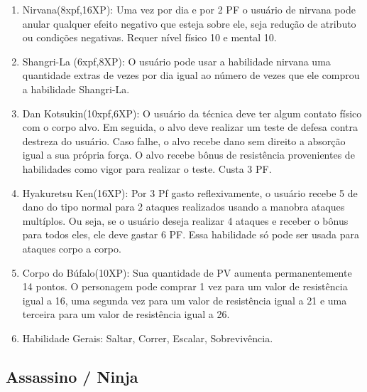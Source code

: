 \begin{enumerate}
	\item Nirvana(8xpf,16XP): Uma vez por dia e por 2 PF o usuário de nirvana pode anular qualquer efeito negativo que esteja sobre ele, seja redução de atributo ou condições negativas. Requer nível físico 10 e mental 10.
	  
  \item Shangri-La (6xpf,8XP): O usuário pode usar a habilidade nirvana uma quantidade extras de vezes por dia igual ao número de vezes que ele comprou a habilidade Shangri-La.
	
	\item Dan Kotsukin(10xpf,6XP): O usuário da técnica deve ter algum contato físico com o corpo alvo. Em seguida, o alvo deve realizar um teste de defesa contra destreza do usuário. Caso falhe, o alvo recebe dano sem direito a absorção igual a sua própria força. O alvo recebe bônus de resistência provenientes de habilidades como vigor para realizar o teste. Custa 3 PF. 
	
	\item Hyakuretsu Ken(16XP): Por 3 Pf gasto reflexivamente, o usuário recebe 5 de dano do tipo normal para 2 ataques realizados usando a manobra ataques multíplos. Ou seja, se o usuário deseja realizar 4 ataques e receber o bônus para todos eles, ele deve gastar 6 PF. Essa habilidade só pode ser usada para ataques corpo a corpo.
 	
    \item Corpo do Búfalo(10XP): Sua quantidade de PV aumenta permanentemente 14 pontos. O personagem pode comprar 1 vez para um valor de resistência igual a 16, uma segunda vez para um valor de resistência igual a 21 e uma terceira para um valor de resistência igual a 26.

  
  	\item Habilidade Gerais: Saltar, Correr, Escalar, Sobrevivência.
\end{enumerate}

\subsection{Assassino / Ninja} 

